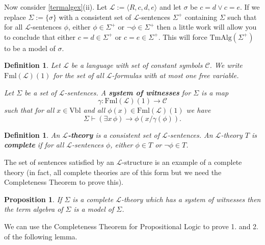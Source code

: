 \documentclass[11pt]{article}
\newcommand{\TmAlg}{\mathrm{TmAlg}}
\newcommand{\proves}{\vdash}
\newcommand{\Fml}{\textrm{Fml}}
\newcommand{\Vbl}{\textrm{Vbl}}
\newtheorem{proposition}[theorem]{Proposition}
\newtheorem{definition}[theorem]{Definition}
\newtheorem{lemma}[theorem]{Lemma}
\newcommand{\mcal}[1]{\mathcal{#1}}
\begin{document}
Now consider \ref{termalgex}(ii). Let $\mcal{L}:=\langle R,c,d,e\rangle$ and let $\sigma$ be $c=d\vee c=e$. If we replace $\Sigma:=\{\sigma\}$ with a consistent set of $\mcal{L}$-sentences $\Sigma^+$ containing $\Sigma$ such that for all $\mcal{L}$-sentences $\phi$, either $\phi\in \Sigma^+$ or $\neg\phi\in \Sigma^+$ then a little work will allow you to conclude that either $c=d\in \Sigma^+$ or $c=e\in \Sigma^+$. This will force $\TmAlg(\Sigma^+)$ to be a model of $\sigma$.

\begin{definition}
Let $\mcal{L}$ be a language with set of constant symbols $\mcal{C}$. We write $\Fml(\mcal{L})(1)$ for the set of all $\mcal{L}$-formulas with at most one free variable.

\medskip

\noindent
Let $\Sigma$ be a set of $\mcal{L}$-sentences. A \textbf{system of witnesses} for $\Sigma$ is a map
\[\gamma: \Fml(\mcal{L})(1)\rightarrow \mcal{C}\] such that for all $x\in\Vbl$ and all $\phi(x)\in\Fml(\mcal{L})(1)$ we have
\[\Sigma\proves (\exists x\, \phi)\rightarrow \phi(x/\gamma(\phi)).\]
\end{definition}

\begin{definition}
An \textbf{$\mcal{L}$-theory} is a consistent set of $\mcal{L}$-sentences. An $\mcal{L}$-theory $T$ is \textbf{complete} if for all $\mcal{L}$-sentences $\phi$, either $\phi\in T$ or $\neg \phi\in T$.
\end{definition}

The set of sentences satisfied by an $\mcal{L}$-structure is an example of a complete theory (in fact, all complete theories are of this form but we need the Completeness Theorem to prove this).

\begin{proposition}\label{TmAlgmodel}
If $\Sigma$ is a complete $\mcal{L}$-theory which has a system of witnesses then the term algebra of $\Sigma$ is a model of $\Sigma$.
\end{proposition}

We can use the Completeness Theorem for Propositional Logic to prove 1. and 2. of the following lemma. %
\end{document}
